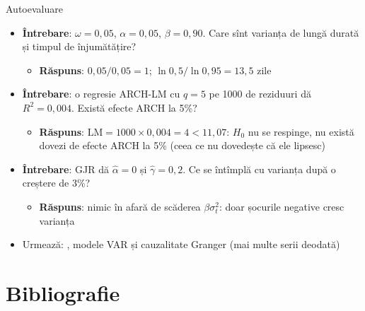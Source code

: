 \begin{frame}{Autoevaluare}
\itemsize{\small}
\begin{itemize}
    \item \textbf{Întrebare}: $\omega = 0{,}05$, $\alpha = 0{,}05$, $\beta = 0{,}90$. Care sînt varianța de lungă durată și timpul de înjumătățire?
    \begin{itemize}
        \item \textbf{Răspuns}: $0{,}05/0{,}05 = 1$; $\ln 0{,}5/\ln 0{,}95 = 13{,}5$ zile
    \end{itemize}
    \item \textbf{Întrebare}: o regresie ARCH-LM cu $q = 5$ pe 1000 de reziduuri dă $R^2 = 0{,}004$. Există efecte ARCH la 5\%?
    \begin{itemize}
        \item \textbf{Răspuns}: $\mathrm{LM} = 1000 \times 0{,}004 = 4 < 11{,}07$: $H_0$ nu se respinge, nu există dovezi de efecte ARCH la 5\% (ceea ce nu dovedește că ele lipsesc)
    \end{itemize}
    \item \textbf{Întrebare}: GJR dă $\hat\alpha = 0$ și $\hat\gamma = 0{,}2$. Ce se întîmplă cu varianța după o creștere de 3\%?
    \begin{itemize}
        \item \textbf{Răspuns}: nimic în afară de scăderea $\beta\sigma_t^2$: doar șocurile negative cresc varianța
    \end{itemize}
    \item Urmează: , modele VAR și cauzalitate Granger (mai multe serii deodată)
\end{itemize}
\end{frame}


\section{Bibliografie}

